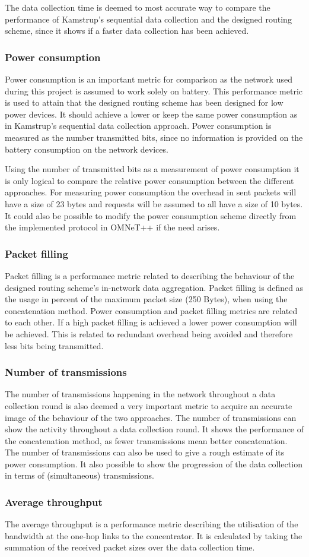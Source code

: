 The data collection time is deemed to most accurate way to compare the performance of Kamstrup's sequential data collection and the designed routing scheme, since it shows if a faster data collection has been achieved.

\subsubsection{Power consumption}

Power consumption is an important metric for comparison as the network used during this project is assumed to work solely on battery. This performance metric is used to attain that the designed routing scheme has been designed for low power devices. It should achieve a lower or keep the same power consumption as in Kamstrup's sequential data collection approach. Power consumption is measured as the number transmitted bits, since no information is provided on the battery consumption on the network devices.

Using the number of transmitted bits as a measurement of power consumption it is only logical to compare the relative power consumption between the different approaches. For measuring power consumption the overhead in sent packets will have a size of 23 bytes and requests will be assumed to all have a size of 10 bytes. It could also be possible to modify the power consumption scheme directly from the implemented protocol in OMNeT++ if the need arises.

\subsubsection{Packet filling}
Packet filling is a performance metric related to describing the behaviour of the designed routing scheme's in-network data aggregation. Packet filling is defined as the usage in percent of the maximum packet size (250 Bytes), when using the concatenation method. Power consumption and packet filling metrics are related to each other. If a high packet filling is achieved a lower power consumption will be achieved. This is related to redundant overhead being avoided and therefore less bits being transmitted.

\subsubsection{Number of transmissions}
The number of transmissions happening in the network throughout a data collection round is also deemed a very important metric to acquire an accurate image of the behaviour of the two approaches. The number of transmissions can show the activity throughout a data collection round. It shows the performance of the concatenation method, as fewer transmissions mean better concatenation. The number of transmissions can also be used to give a rough estimate of its power consumption. It also possible to show the progression of the data collection in terms of (simultaneous) transmissions.

\subsubsection{Average throughput}
The average throughput is a performance metric describing the utilisation of the bandwidth at the one-hop links to the concentrator. It is calculated by taking the summation of the received packet sizes over the data collection time.

